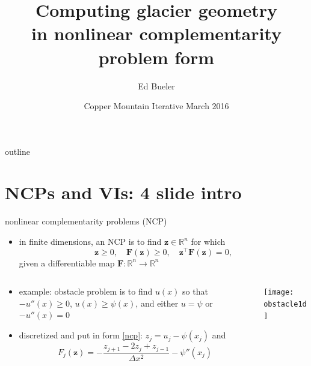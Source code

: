 \documentclass{beamer}
\title[Computing glacier geometry]{Computing glacier geometry \\ in nonlinear complementarity problem form}
\author{Ed Bueler}
\institute[UAF] %
{
  Dept of Mathematics and Statistics, and Geophysical Institute\\
  University of Alaska Fairbanks \\
  \tiny (\emph{funded by NASA Modeling, Analysis, and Prediction program})%
}
\date[Copper Mtn 2016]{Copper Mountain Iterative March 2016}
\newcommand\bz{\mathbf{z}}
\newcommand\bF{\mathbf{F}}
\newcommand\RR{\mathbb{R}}
\begin{document}
\graphicspath{{../../talks-public/commonfigs/}}

\begin{frame}
  \titlepage
\end{frame}


\begin{frame}{outline}
  \tableofcontents
\end{frame}


\section{NCPs and VIs: 4 slide intro}

\begin{frame}{nonlinear complementarity problems (NCP)}

\begin{itemize}
\item in finite dimensions, an NCP is to find $\bz\in\RR^n$ for which
\begin{equation}
\bz \ge 0, \quad \bF(\bz) \ge 0, \quad \bz^\top \bF(\bz) = 0, \label{ncp}
\end{equation}
given a differentiable map $\bF:\RR^n \to \RR^n$
\end{itemize}

\begin{columns}
\begin{column}{0.5\textwidth}
\small
\begin{itemize}
\item \alert{example}: obstacle problem is to find $u(x)$ so that $-u''(x) \ge 0$, $u(x) \ge \psi(x)$, and either $u=\psi$ or $-u''(x) = 0$
\item discretized and put in form \eqref{ncp}: $z_j=u_j - \psi(x_j)$ and
  $$F_j(\bz) = - \frac{z_{j+1} - 2 z_j + z_{j-1}}{\Delta x^2} - \psi''(x_j)$$
\end{itemize}
\end{column}
\begin{column}{0.5\textwidth}
\texttt{[image: obstacle1d]}
\end{column}
\end{columns}
\end{frame}
\end{document}
